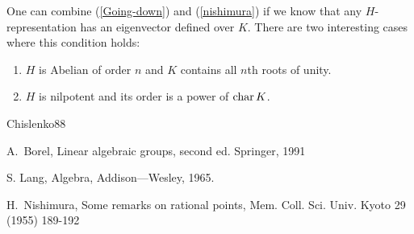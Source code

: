 \begin{remark}  One can combine (\ref{Going-down}) and 
(\ref{nishimura}) if we know that any $H$-representation has an
eigenvector defined over $K$. There are two interesting cases
where this condition holds:
\begin{enumerate}
\item  $H$ is Abelian of order $n$ and $K$ contains all $n$th
roots of unity.
\item $H$ is nilpotent and its order is a power of $\operatorname{char} K$.
\end{enumerate}
\end{remark}


\begin{thebibliography}{Chislenko88}

  A.\ Borel, Linear algebraic groups,
second ed. Springer, 1991

S. Lang, Algebra, Addison---Wesley, 1965.

 H.\ Nishimura, Some remarks on
rational points, Mem. Coll. Sci. Univ. Kyoto  29 (1955)
189-192 

\end{thebibliography}
\endgroup  %























